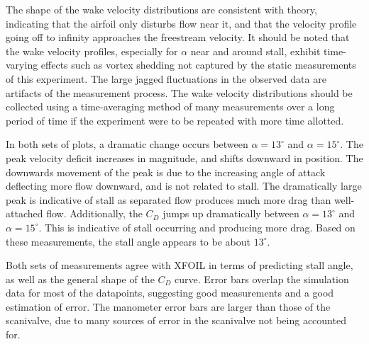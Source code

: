 \documentclass[runningheads]{llncs}
\begin{document}
\noindent
The shape of the wake velocity distributions are consistent with theory, indicating that the airfoil only disturbs flow near it, and that the velocity profile going off to infinity approaches the freestream velocity. It should be noted that the wake velocity profiles, especially for $\alpha$ near and around stall, exhibit time-varying effects such as vortex shedding not captured by the static measurements of this experiment. The large jagged fluctuations in the observed data are artifacts of the measurement process. The wake velocity distributions should be collected using a time-averaging method of many measurements over a long period of time if the experiment were to be repeated with more time allotted.\newline

\noindent
In both sets of plots, a dramatic change occurs between $\alpha = 13^\circ$ and $\alpha = 15 ^\circ$. The peak velocity deficit increases in magnitude, and shifts downward in position. The downwards movement of the peak is due to the increasing angle of attack deflecting more flow downward, and is not related to stall. The dramatically large peak is indicative of stall as separated flow produces much more drag than well-attached flow. Additionally, the $C_D$ jumps up dramatically between $\alpha = 13^\circ$ and $\alpha = 15 ^\circ$. This is indicative of stall occurring and producing more drag. Based on these measurements, the stall angle appears to be about $13^\circ$.\newline

\noindent
Both sets of measurements agree with XFOIL in terms of predicting stall angle, as well as the general shape of the $C_D$ curve. Error bars overlap the simulation data for most of the datapoints, suggesting good measurements and a good estimation of error. The manometer error bars are larger than those of the scanivalve, due to many sources of error in the scanivalve not being accounted for.\newline
\end{document}
